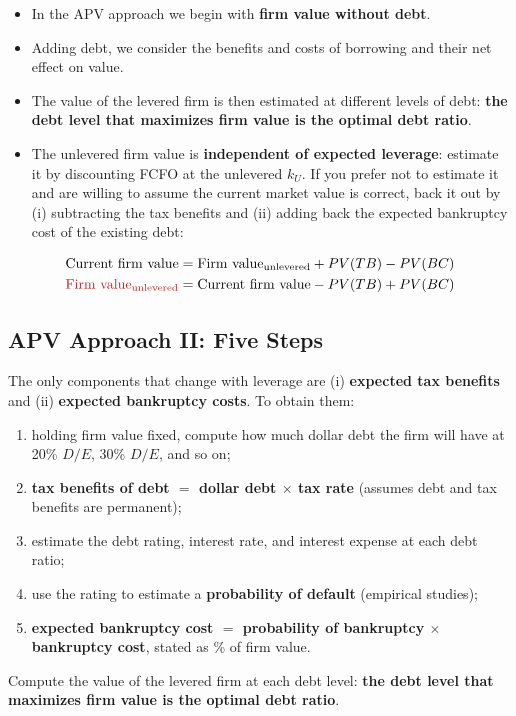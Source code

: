\begin{itemize}
  \item In the APV approach we begin with \textbf{firm value without debt}.
  \item Adding debt, we consider the benefits and costs of borrowing and their net effect on value.
  \item The value of the levered firm is then estimated at different levels of debt: \textcolor{keyred}{\textbf{the debt level that maximizes firm value is the optimal debt ratio}}.
  \item The unlevered firm value is \textbf{independent of expected leverage}: estimate it by discounting FCFO at the unlevered $k_U$. If you prefer not to estimate it and are willing to assume the current market value is correct, back it out by (i) subtracting the tax benefits and (ii) adding back the expected bankruptcy cost of the existing debt:
\end{itemize}
\begin{keybox}
\begin{align*}
\text{Current firm value} &= \text{Firm value}_{\text{unlevered}}+PV(TB)-PV(BC)\\
\textcolor{keyred}{\text{Firm value}_{\text{unlevered}}} &= \text{Current firm value}-PV(TB)+PV(BC)
\end{align*}
\end{keybox}

\subsection[APV Approach II: Five Steps]{APV Approach II: Five Steps }

The only components that change with leverage are (i) \textbf{expected tax benefits} and (ii) \textbf{expected bankruptcy costs}. To obtain them:
\begin{enumerate}[label=\alph*)]
  \item holding firm value fixed, compute how much dollar debt the firm will have at 20\% $D/E$, 30\% $D/E$, and so on;
  \item \textbf{tax benefits of debt $=$ dollar debt $\times$ tax rate} (assumes debt and tax benefits are permanent);
  \item estimate the debt rating, interest rate, and interest expense at each debt ratio;
  \item use the rating to estimate a \textbf{probability of default} (empirical studies);
  \item \textbf{expected bankruptcy cost $=$ probability of bankruptcy $\times$ bankruptcy cost}, stated as \% of firm value.
\end{enumerate}
Compute the value of the levered firm at each debt level: \textcolor{keyred}{\textbf{the debt level that maximizes firm value is the optimal debt ratio}}.

